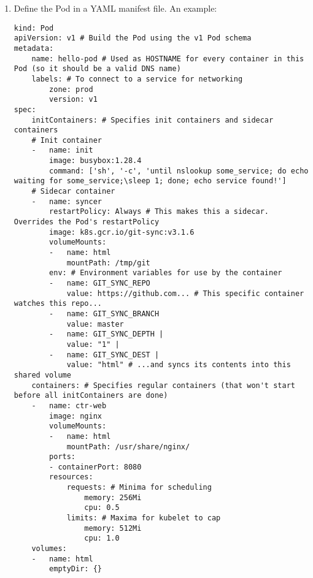 \documentclass[8pt, table, xcdraw]{article}%
\begin{document}
\begin{enumerate}
    \item Define the Pod in a YAML manifest file. An example:
	\begin{lstlisting}
kind: Pod
apiVersion: v1 # Build the Pod using the v1 Pod schema
metadata:
	name: hello-pod # Used as HOSTNAME for every container in this Pod (so it should be a valid DNS name)
	labels: # To connect to a service for networking
		zone: prod
		version: v1
spec:
    initContainers: # Specifies init containers and sidecar containers
    # Init container
    -   name: init
        image: busybox:1.28.4
        command: ['sh', '-c', 'until nslookup some_service; do echo waiting for some_service;\sleep 1; done; echo service found!']
    # Sidecar container
    -   name: syncer
        restartPolicy: Always # This makes this a sidecar. Overrides the Pod's restartPolicy
        image: k8s.gcr.io/git-sync:v3.1.6
        volumeMounts:
        -   name: html
            mountPath: /tmp/git
        env: # Environment variables for use by the container
        -   name: GIT_SYNC_REPO
            value: https://github.com... # This specific container watches this repo...
        -   name: GIT_SYNC_BRANCH
            value: master
        -   name: GIT_SYNC_DEPTH |
            value: "1" |
        -   name: GIT_SYNC_DEST |
            value: "html" # ...and syncs its contents into this shared volume
	containers: # Specifies regular containers (that won't start before all initContainers are done)
	-   name: ctr-web
		image: nginx
        volumeMounts:
        -   name: html
            mountPath: /usr/share/nginx/
		ports:
		- containerPort: 8080
		resources:
            requests: # Minima for scheduling
                memory: 256Mi
                cpu: 0.5
			limits: # Maxima for kubelet to cap
				memory: 512Mi
				cpu: 1.0
    volumes:
    -   name: html
        emptyDir: {}       
	\end{lstlisting}
	

\end{enumerate}
\end{document}
